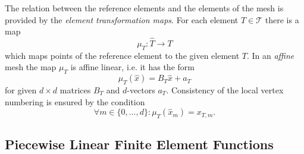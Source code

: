 \documentclass[a4paper,12pt]{article}
\begin{document}
The relation between the reference elements and the elements of the mesh
is provided by the {\em element transformation maps}.
For each element $T\in\mathcal{T}$ there is a map
$$\mu_T : \hat T \to T$$ which maps points of the reference element to the
given element $T$. In an {\em affine} mesh the map $\mu_T$ is affine linear, i.e. it
has the form 
\begin{equation*}
\mu_T(\hat x) = B_T \hat x + a_T
\end{equation*}
for given $d\times d$ matrices $B_T$ and $d$-vectors $a_T$.
Consistency of the local vertex numbering is ensured by the condition
$$\forall m\in\{0,\ldots,d\} : \mu_T(\hat x_m) = x_{T,m}.$$

\subsection{Piecewise Linear Finite Element Functions}
\end{document}
